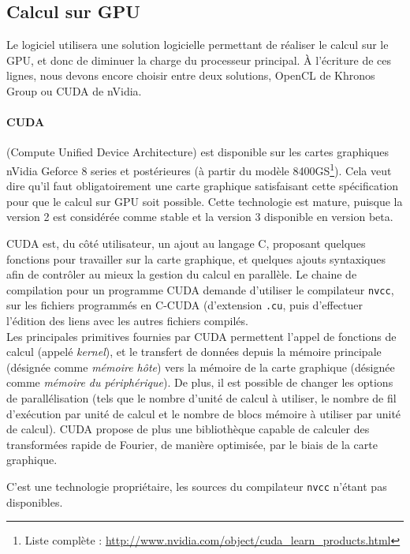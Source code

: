 		\subsection{Calcul sur GPU}
			Le logiciel utilisera une solution logicielle permettant de réaliser le calcul sur le GPU, et donc de diminuer la charge du processeur principal.
			À l'écriture de ces lignes, nous devons encore choisir entre deux solutions, OpenCL de Khronos Group ou CUDA de nVidia.

			\paragraph{CUDA}
				(Compute Unified Device Architecture) est disponible sur les cartes graphiques nVidia Geforce 8 series  et postérieures (à partir du modèle 8400GS\footnote{Liste complète : \url{http://www.nvidia.com/object/cuda\_learn\_products.html}}). Cela veut dire qu'il faut obligatoirement une carte graphique satisfaisant cette spécification pour que le calcul sur GPU soit possible. Cette technologie est mature, puisque la version 2 est considérée comme stable et la version 3 disponible en version beta.

				CUDA est, du côté utilisateur, un ajout au langage C, proposant quelques fonctions pour travailler sur la carte graphique, et quelques ajouts syntaxiques afin de contrôler au mieux la gestion du calcul en parallèle. Le chaine de compilation pour un programme CUDA demande d'utiliser le compilateur {\tt nvcc}, sur les fichiers programmés en C-CUDA (d'extension {\tt .cu}, puis d'effectuer l'édition des liens avec les autres fichiers compilés.\\

				Les principales primitives fournies par CUDA permettent l'appel de fonctions de calcul (appelé \emph{kernel}), et le transfert de données depuis la mémoire principale (désignée comme \emph{mémoire hôte}) vers la mémoire de la carte graphique (désignée comme \emph{mémoire du périphérique}). De plus, il est possible de changer les options de parallélisation (tels que le nombre d'unité de calcul à utiliser, le nombre de fil d'exécution par unité de calcul et le nombre de blocs mémoire à utiliser par unité de calcul).
				CUDA propose de plus une bibliothèque capable de calculer des transformées rapide de Fourier, de manière optimisée, par le biais de la carte graphique.
	
				C'est une technologie propriétaire, les sources du compilateur {\tt nvcc} n'étant pas disponibles.

